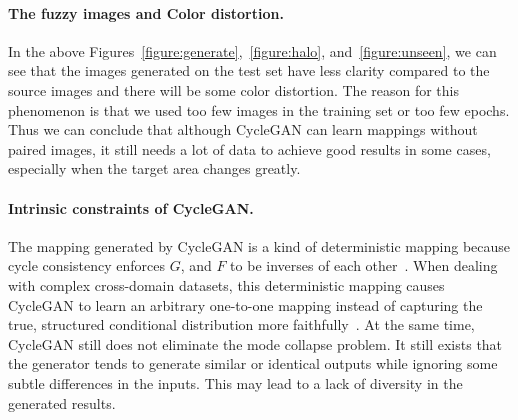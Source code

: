 \paragraph{The fuzzy images and Color distortion.} In the above Figures~\ref{figure:generate},~\ref{figure:halo}, and~\ref{figure:unseen}, we can see that the images generated on the test set have less clarity compared to the source images and there will be some color distortion. The reason for this phenomenon is that we used too few images in the training set or too few epochs. Thus we can conclude that although CycleGAN can learn mappings without paired images, it still needs a lot of data to achieve good results in some cases, especially when the target area changes greatly.

\paragraph{Intrinsic constraints of CycleGAN.} The mapping generated by CycleGAN is a kind of deterministic mapping because cycle consistency enforces $G$, and $F$ to be inverses of each other~\cite{almahairi2018augmented}. When dealing with complex cross-domain datasets, this deterministic mapping causes CycleGAN to learn an arbitrary one-to-one mapping instead of capturing the true, structured conditional distribution more faithfully~\cite{almahairi2018augmented}. At the same time, CycleGAN still does not eliminate the mode collapse problem. It still exists that the generator tends to generate similar or identical outputs while ignoring some subtle differences in the inputs. This may lead to a lack of diversity in the generated results.

\newpage
